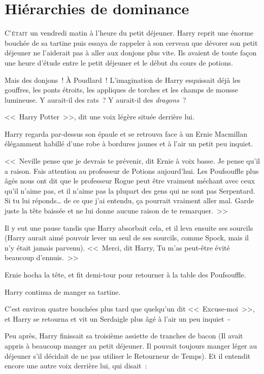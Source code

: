 \chapter{Hiérarchies de dominance}

\lettrine{C}{'était} un vendredi matin à l'heure du petit déjeuner. Harry reprit une énorme bouchée de sa tartine puis essaya de rappeler à son cerveau que dévorer son petit déjeuner ne l'aiderait pas à aller aux donjons plus vite. Ils avaient de toute façon une heure d'étude entre le petit déjeuner et le début du cours de potions.

Mais des donjons~! À Poudlard~! L'imagination de Harry esquissait déjà les gouffres, les ponts étroits, les appliques de torches et les champs de mousse lumineuse. Y aurait-il des rats~? Y aurait-il des \emph{dragons}~?

<<~Harry Potter~>>, dit une voix légère située derrière lui.

Harry regarda par-dessus son épaule et se retrouva face à un Ernie Macmillan élégamment habillé d’une robe à bordures jaunes et à l'air un petit peu inquiet.

<<~Neville pense que je devrais te prévenir, dit Ernie à voix basse. Je pense qu'il a raison. Fais attention au professeur de Potions aujourd'hui. Les Poufsouffle plus âgés nous ont dit que le professeur Rogue peut être vraiment méchant avec ceux qu'il n'aime pas, et il n'aime pas la plupart des gens qui ne sont pas Serpentard. Si tu lui réponds… de ce que j'ai entendu, ça pourrait vraiment aller mal. Garde juste la tête baissée et ne lui donne aucune raison de te remarquer.~>>

Il y eut une pause tandis que Harry absorbait cela, et il leva ensuite ses sourcils (Harry aurait aimé pouvoir lever un seul de ses sourcils, comme Spock, mais il n'y était jamais parvenu). <<~Merci, dit Harry, Tu m'as peut-être évité beaucoup d'ennuis.~>>

Ernie hocha la tête, et fit demi-tour pour retourner à la table des Poufsouffle.

Harry continua de manger sa tartine.

C'est environ quatre bouchées plus tard que quelqu'un dit <<~Excuse-moi~>>, et Harry se retourna et vit un Serdaigle plus âgé à l'air un peu inquiet~-

Peu après, Harry finissait sa troisième assiette de tranches de bacon (Il avait appris à beaucoup manger au petit déjeuner. Il pouvait toujours manger léger au déjeuner s'il décidait de ne pas utiliser le Retourneur de Temps). Et il entendit encore une autre voix derrière lui, qui disait~:

